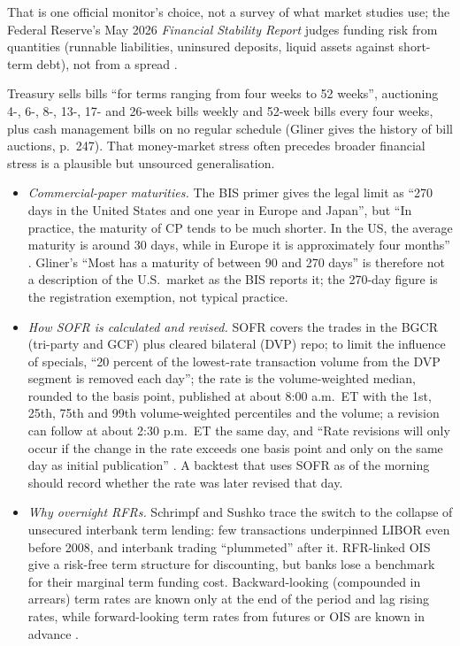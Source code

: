\begin{qfdefinition}
That is one official monitor's choice, not a survey of what market studies use; the Federal Reserve's May 2026 \emph{Financial Stability Report} judges funding risk from quantities (runnable liabilities, uninsured deposits, liquid assets against short-term debt), not from a spread \citep[sec.~4]{fed-fsr-2026-05}.

 Treasury sells bills ``for terms ranging from four weeks to 52 weeks'', auctioning 4-, 6-, 8-, 13-, 17- and 26-week bills weekly and 52-week bills every four weeks, plus cash management bills on no regular schedule \citep[Treasury Bills page]{treasurydirect-bills} (Gliner gives the history of bill auctions, p.~247). That money-market stress often precedes broader financial stress is a plausible but unsourced generalisation.

\begin{itemize}
\item \emph{Commercial-paper maturities.} The BIS primer gives the legal limit as ``270 days in the United States and one year in Europe and Japan'', but ``In practice, the maturity of CP tends to be much shorter. In the US, the average maturity is around 30 days, while in Europe it is approximately four months'' \citep[sec.\ ``Main funding instruments and their characteristics'']{gap-money-cp-cd-primer}. Gliner's ``Most has a maturity of between 90 and 270 days'' is therefore not a description of the U.S.\ market as the BIS reports it; the 270-day figure is the registration exemption, not typical practice.
\item \emph{How SOFR is calculated and revised.} SOFR covers the trades in the BGCR (tri-party and GCF) plus cleared bilateral (DVP) repo; to limit the influence of specials, ``20 percent of the lowest-rate transaction volume from the DVP segment is removed each day''; the rate is the volume-weighted median, rounded to the basis point, published at about 8:00 a.m.\ ET with the 1st, 25th, 75th and 99th volume-weighted percentiles and the volume; a revision can follow at about 2:30 p.m.\ ET the same day, and ``Rate revisions will only occur if the change in the rate exceeds one basis point and only on the same day as initial publication'' \citep[sections on SOFR, calculation methodology and publication and revisions]{exp-sofr-data}. A backtest that uses SOFR as of the morning should record whether the rate was later revised that day.
\item \emph{Why overnight RFRs.} Schrimpf and Sushko trace the switch to the collapse of unsecured interbank term lending: few transactions underpinned LIBOR even before 2008, and interbank trading ``plummeted'' after it. RFR-linked OIS give a risk-free term structure for discounting, but banks lose a benchmark for their marginal term funding cost. Backward-looking (compounded in arrears) term rates are known only at the end of the period and lag rising rates, while forward-looking term rates from futures or OIS are known in advance \citep[BIS Quarterly Review, March 2019, sections on the case for reform and on term rates]{rt-schrimpf-sushko-rfr-2019}.

\end{itemize}
\end{qfdefinition}
